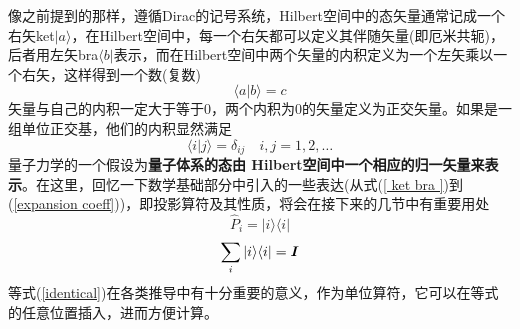 \documentclass[12pt,a4paper,openany,twoside]{book}
\numberwithin{equation}{section}
\begin{document}
        像之前提到的那样，遵循Dirac的记号系统，Hilbert空间中的态矢量通常记成一个右矢ket$ | a \rangle $，在Hilbert空间中，每一个右矢都可以定义其伴随矢量(即厄米共轭)，后者用左矢bra$ \langle b | $表示，而在Hilbert空间中两个矢量的内积定义为一个左矢乘以一个右矢，这样得到一个数(复数)
        \begin{equation}
          \langle a | b\rangle= c
          \label{inner product}
        \end{equation}
        矢量与自己的内积一定大于等于0，两个内积为0的矢量定义为正交矢量。如果是一组单位正交基，他们的内积显然满足
        \begin{equation}
          \langle i | j\rangle=\delta_{i j} \quad i, j=1,2, \ldots
        \end{equation}
        量子力学的一个假设为\textbf{量子体系的态由 Hilbert空间中一个相应的归一矢量来表示}。在这里，回忆一下数学基础部分中引入的一些表达(从式(\ref{ ket bra })到(\ref{expansion coeff}))，即投影算符及其性质，将会在接下来的几节中有重要用处
        \begin{equation}
          \hat{P}_i= | i \rangle \langle i |
          \label{projection operator}
        \end{equation}
        \begin{equation}
          \sum_i | i \rangle \langle i | = \vb*{I}
          \label{identical}
        \end{equation}
        等式(\ref{identical})在各类推导中有十分重要的意义，作为单位算符，它可以在等式的任意位置插入，进而方便计算。
\end{document}
